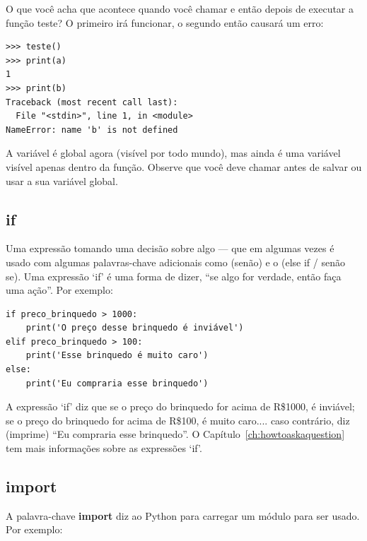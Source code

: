 O que você acha que acontece quando você chamar  e então  depois de executar a função teste? O primeiro irá funcionar, o segundo então causará um erro:

\begin{listing}
\begin{verbatim}
>>> teste()
>>> print(a)
1
>>> print(b)
Traceback (most recent call last):
  File "<stdin>", line 1, in <module>
NameError: name 'b' is not defined
\end{verbatim}
\end{listing}

A variável  é global agora (visível por todo mundo), mas  ainda é uma variável visível apenas dentro da função. Observe que você deve chamar  antes de salvar ou usar a sua variável global.

\subsection*{if}

Uma expressão tomando uma decisão sobre algo --- que em algumas vezes é usado com algumas palavras-chave adicionais como  (senão) e o  (else if / senão se). Uma expressão `if' é uma forma de dizer, ``se algo for verdade, então faça uma ação''. Por exemplo:

\begin{listing}
\begin{verbatim}
if preco_brinquedo > 1000:
    print('O preço desse brinquedo é inviável')
elif preco_brinquedo > 100:
    print('Esse brinquedo é muito caro')
else:
    print('Eu compraria esse brinquedo')
\end{verbatim}
\end{listing}

A expressão `if' diz que se o preço do brinquedo for acima de R\$1000, é inviável; se o preço do brinquedo for acima de R\$100, é muito caro.... caso contrário, diz (imprime) ``Eu compraria esse brinquedo''. O Capítulo~\ref{ch:howtoaskaquestion} tem mais informações sobre as expressões `if'.

\subsection*{import}

A palavra-chave \textbf{import} diz ao Python para carregar um módulo para ser usado. Por exemplo:

